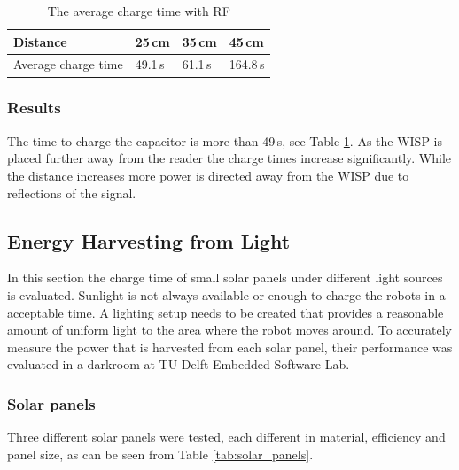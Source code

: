 \begin{table}[t]
	\centering
	\caption{The average charge time with RF}
	\label{tab:res_rf_harvest}
	\begin{tabular}{|l||l|l|l|}
		\hline
		Distance & 25\,cm & 35\,cm & 45\,cm \\
		\hline \hline
		Average charge time & 49.1\,s & 61.1\,s & 164.8\,s \\
		\hline
	\end{tabular}
\end{table}

\subsubsection{Results}
The time to charge the capacitor is more than 49\,s, see Table \ref{tab:res_rf_harvest}.
As the WISP is placed further away from the reader the charge times increase significantly.
While the distance increases more power is directed away from the WISP due to reflections of the signal.

\subsection{Energy Harvesting from Light}

In this section the charge time of small solar panels under different light sources is evaluated.
Sunlight is not always available or enough to charge the robots in a acceptable time.
A lighting setup needs to be created that provides a reasonable amount of uniform light to the area where the robot moves around.
To accurately measure the power that is harvested from each solar panel, their performance was evaluated in a darkroom at TU Delft Embedded Software Lab.

\subsubsection{Solar panels}
Three different solar panels were tested, each different in material, efficiency and panel size, as can be seen from Table \ref{tab:solar_panels}.


